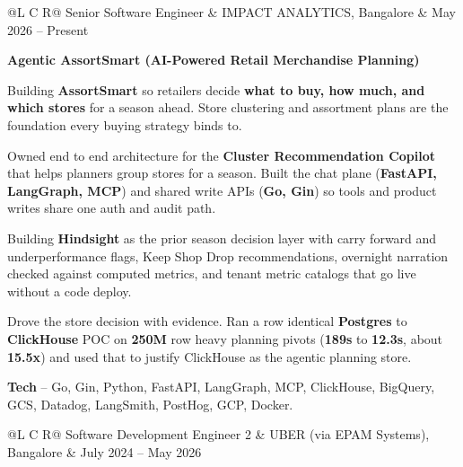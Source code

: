 
\noindent
\begin{tabularx}{\textwidth}{@{}L C R@{}}
\textcolor{role}{Senior Software Engineer} & \textcolor{company}{IMPACT ANALYTICS, Bangalore} & \textcolor{date}{May 2026 -- Present}\\
\end{tabularx}
\vspace{-2ex}

\textcolor{Project}{\textbf{Agentic AssortSmart (AI-Powered Retail Merchandise Planning)}}
\vspace{-1ex}
\begin{zitemize}
    \item Building \textbf{AssortSmart} so retailers decide \textbf{what to buy, how much, and which stores} for a season ahead. Store clustering and assortment plans are the foundation every buying strategy binds to.
    \item Owned end to end architecture for the \textbf{Cluster Recommendation Copilot} that helps planners group stores for a season. Built the chat plane (\textbf{FastAPI, LangGraph, MCP}) and shared write APIs (\textbf{Go, Gin}) so tools and product writes share one auth and audit path.
    \item Building \textbf{Hindsight} as the prior season decision layer with carry forward and underperformance flags, Keep Shop Drop recommendations, overnight narration checked against computed metrics, and tenant metric catalogs that go live without a code deploy.
    \item Drove the store decision with evidence. Ran a row identical \textbf{Postgres} to \textbf{ClickHouse} POC on \textbf{250M} row heavy planning pivots (\textbf{189s} to \textbf{12.3s}, about \textbf{15.5x}) and used that to justify ClickHouse as the agentic planning store.
    \item \textbf{Tech} -- Go, Gin, Python, FastAPI, LangGraph, MCP, ClickHouse, BigQuery, GCS, Datadog, LangSmith, PostHog, GCP, Docker.
\end{zitemize}

\vspace{0.2ex}
\noindent
\begin{tabularx}{\textwidth}{@{}L C R@{}}
\textcolor{role}{Software Development Engineer 2} & \textcolor{company}{UBER (via EPAM Systems), Bangalore} & \textcolor{date}{July 2024 -- May 2026}\\
\end{tabularx}
\vspace{-2ex}

